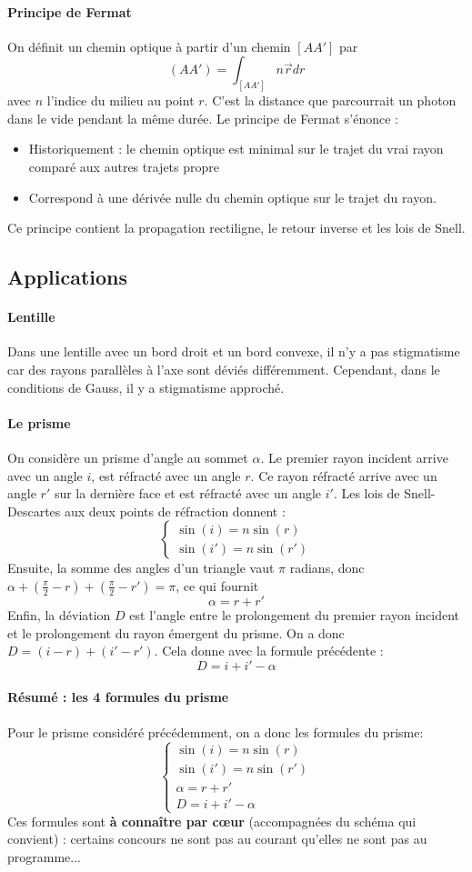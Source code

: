 \documentclass[french]{book}
\theoremstyle{plain}
\theoremstyle{definition}
\theoremstyle{remark}
\begin{document}
\paragraph{Principe de Fermat} On définit un chemin optique à partir d’un chemin $[AA']$ par $$(AA') =\int_{[AA']}n\overrightarrow{r}dr$$ avec $n$ l’indice du milieu au point $r$. C’est la distance que parcourrait un photon dans le vide pendant la même durée. Le principe de Fermat s’énonce :
\begin{itemize}
	\item Historiquement : le chemin optique est minimal sur le trajet du vrai rayon comparé aux autres trajets propre
	\item Correspond à une dérivée nulle du chemin optique sur le trajet du rayon.
\end{itemize}
Ce principe contient la propagation rectiligne, le retour inverse et les lois de Snell.
\subsection{Applications}
\paragraph{Lentille} Dans une lentille avec un bord droit et un bord convexe, il n'y a pas stigmatisme car des rayons parallèles à l'axe sont déviés différemment. Cependant, dans le conditions de Gauss, il y a stigmatisme approché.
\paragraph{Le prisme} On considère un prisme d'angle au sommet $\alpha$. Le premier rayon incident arrive avec un angle $i$, est réfracté avec un angle $r$. Ce rayon réfracté arrive avec un angle $r'$ sur la dernière face et est réfracté avec un angle $i'$. Les lois de Snell-Descartes aux deux points de réfraction donnent : $$\begin{cases}
	\sin(i)=n\sin(r)\\
	\sin(i')=n\sin(r')
\end{cases}$$ Ensuite, la somme des angles d'un triangle vaut $\pi$ radians, donc $\alpha+\displaystyle\left(\frac{\pi}{2}-r\right)+\left(\frac{\pi}{2}-r'\right)=\pi$, ce qui fournit $$\alpha=r+r'$$ Enfin, la déviation $D$ est l'angle entre le prolongement du premier rayon incident et le prolongement du rayon émergent du prisme. On a donc $D=(i-r)+(i'-r')$. Cela donne avec la formule précédente : $$D=i+i'-\alpha$$
\paragraph{Résumé : les 4 formules du prisme} Pour le prisme considéré précédemment, on a donc les formules du prisme:  $$\begin{cases}
	\sin(i)=n\sin(r)\\
	\sin(i')=n\sin(r')\\
	\alpha=r+r'\\
	D=i+i'-\alpha
\end{cases}$$ Ces formules sont \textbf{à connaître par cœur} (accompagnées du schéma qui convient) : certains concours ne sont pas au courant qu'elles ne sont pas au programme...
\end{document}
